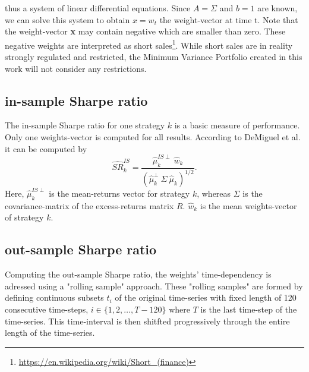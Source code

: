 thus a system of linear differential equations. Since $A = \Sigma$ and $b = 1$ are known, we can solve this system to obtain $x = w_t$ the weight-vector at time t. Note that the weight-vector \textbf{x} may contain negative which are smaller than zero. These negative weights are interpreted as short sales\footnote{\url{https://en.wikipedia.org/wiki/Short_(finance)}}. While short sales are in reality strongly regulated and restricted, the Minimum Variance Portfolio created in this work will not consider any restrictions.

\subsection{in-sample Sharpe ratio}
The in-sample Sharpe ratio for one strategy $k$ is a basic measure of performance. Only one weights-vector is computed for all results. According to DeMiguel et al. \cite[p. 1928]{DEM09} it can be computed by
\begin{equation} \label{eq:in-sample-sharpe}
\widehat{SR}^{IS}_{k} = \frac{\hat{\mu}^{IS\perp}_{k}~\hat{w}_k}{\left( \hat{\mu}_k^{\perp}~\Sigma~\hat{\mu}_k\right)^{1/2}}.
\end{equation}
Here, $\hat{\mu}^{IS\perp}_{k}$ is the mean-returns vector for strategy $k$, whereas $\Sigma$ is the covariance-matrix of the excess-returns matrix $R$. $\hat{w}_k$ is the mean weights-vector of strategy $k$.

\subsection{out-sample Sharpe ratio} \label{subsec:out-sample-sharpe-ratio}
Computing the out-sample Sharpe ratio, the weights' time-dependency is adressed using a "rolling sample" approach\cite[p.1927]{DEM09}. These "rolling samples" are formed by defining continuous subsets $t_i$ of the original time-series with fixed length of 120 consecutive time-steps, $i \in \lbrace1, 2, \dots, T-120 \rbrace$ where $T$ is the last time-step of the time-series. This time-interval is then shitfted progressively through the entire length of the time-series.\\

